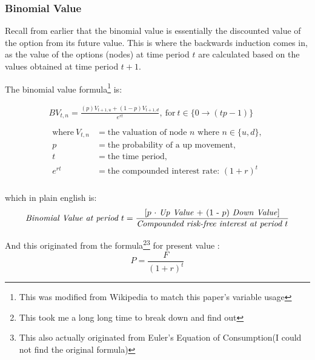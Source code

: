 \documentclass[12pt, letterpaper]{article}\usepackage{float}
\begin{document}
\subsubsection*{Binomial Value}
Recall from earlier that the binomial value is essentially the discounted value of the option from its future value.
This is where the backwards induction comes in, as the value of the options (nodes) at time period ${t}$ are calculated based on the values obtained at time period ${t+1}$.

\bigskip

The binomial value formula\footnote{This was modified from Wikipedia to match this paper's variable usage} is:

\begin{gather*}
  BV_{t, n} = \frac{(p)V_{t+1,u} + (1-p)V_{t+1,d}}{e^{rt}},~\text{for}~t \in \{0 \rightarrow (tp-1) \} \\
  \\
  \begin{align*}
    \text{where}~V_{t,n} &= \text{the valuation of node ${n}$ where ${n \in \{u, d\}}$}, \\
    p &= \text{the probability of a up movement}, \\
    t &= \text{the time period}, \\
    e^{rt} &= \text{the compounded interest rate: } (1 + r)^t
  \end{align*} \\
\end{gather*}

\pagebreak

\noindent which in plain english is:
\begin{equation*}
  \text{\textit{Binomial Value at period ${t}$}} = \frac{\text{[${p}$ ${\cdot}$ \textit{Up Value} + (1 - ${p}$) \textit{Down Value}]}}{\text{\textit{Compounded risk-free interest at period ${t}$}}}
\end{equation*}

\bigskip

And this originated from the formula\footnote{This took me a long long time to break down and find out}\footnote{This also actually originated from Euler's Equation of Consumption\cite{riskneutralmeasurestackexchange}(I could not find the original formula) } for present value \cite{presentvaluewikipedia}:
\begin{equation*}
  P = \frac{F}{(1+r)^t}
\end{equation*}
\end{document}
